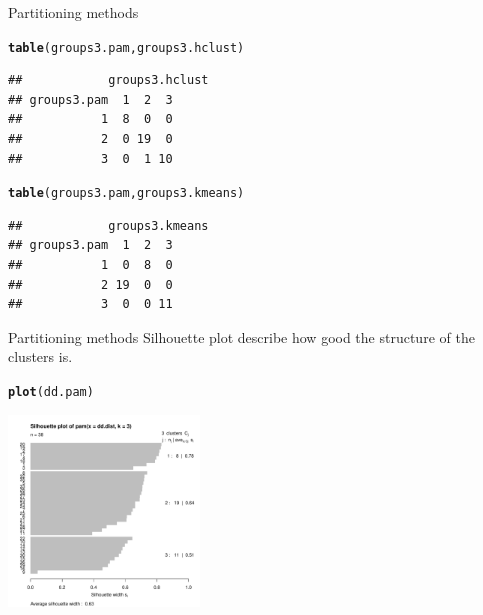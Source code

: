 \documentclass[10pt,xcolor=dvipsnames]{beamer}\usepackage[]{graphicx}\usepackage[]{color}
\makeatletter
\newcommand{\hlstd}[1]{\textcolor[rgb]{0.345,0.345,0.345}{#1}}%
\newcommand{\hlkwd}[1]{\textcolor[rgb]{0.737,0.353,0.396}{\textbf{#1}}}%
\newenvironment{kframe}{%
 \def\at@end@of@kframe{}%
 \ifinner\ifhmode%
  \def\at@end@of@kframe{\end{minipage}}%
  \begin{minipage}{\columnwidth}%
 \fi\fi%
 \def\FrameCommand##1{\hskip\@totalleftmargin \hskip-\fboxsep
 \colorbox{shadecolor}{##1}\hskip-\fboxsep
     \hskip-\linewidth \hskip-\@totalleftmargin \hskip\columnwidth}%
 \MakeFramed {\advance\hsize-\width
   \@totalleftmargin\z@ \linewidth\hsize
   \@setminipage}}%
 {\par\unskip\endMakeFramed%
 \at@end@of@kframe}
\newenvironment{knitrout}{}{} %
\makeatother
\begin{document}
\begin{frame}{Partitioning methods}
\begin{knitrout}\footnotesize
{}\color{fgcolor}\begin{kframe}
\begin{alltt}
\hlkwd{table}\hlstd{(groups3.pam, groups3.hclust)}
\end{alltt}
\begin{verbatim}
##            groups3.hclust
## groups3.pam  1  2  3
##           1  8  0  0
##           2  0 19  0
##           3  0  1 10
\end{verbatim}
\begin{alltt}
\hlkwd{table}\hlstd{(groups3.pam, groups3.kmeans)}
\end{alltt}
\begin{verbatim}
##            groups3.kmeans
## groups3.pam  1  2  3
##           1  0  8  0
##           2 19  0  0
##           3  0  0 11
\end{verbatim}
\end{kframe}
\end{knitrout}

\end{frame}


\begin{frame}{Partitioning methods}
Silhouette plot describe how good the structure of the clusters is.
\begin{knitrout}\footnotesize
{}\color{fgcolor}\begin{kframe}
\begin{alltt}
\hlkwd{plot}\hlstd{(dd.pam)}
\end{alltt}
\end{kframe}

{\centering \includegraphics[width=2in]{figure/pamPlot-1} 

}



\end{knitrout}

\end{frame}
\end{document}
